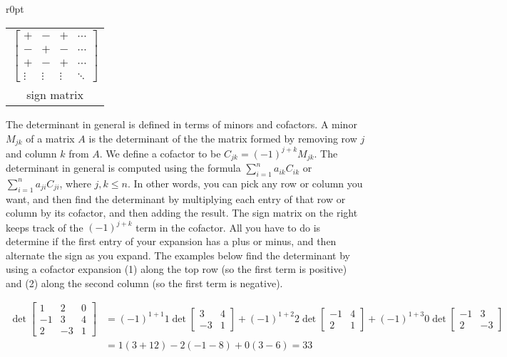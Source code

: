\documentclass[10pt]{article}
\begin{document}
\begin{wraptable}[7]{r}{0pt}
\small
\begin{tabular}{c}
$\begin{bmatrix}
+&-&+&\cdots\\
-&+&-&\cdots\\
+&-&+&\cdots\\
\vdots&\vdots&\vdots&\ddots
\end{bmatrix}$ 
\\
sign matrix
\end{tabular}\end{wraptable}
The determinant in general is defined in terms of minors and cofactors.  A minor {$M_{jk}$} of a matrix {$A$} is the determinant of the the matrix formed by removing row {$j$} and column {$k$} from {$A$}.  We define a cofactor to be {$C_{jk} = (-1)^{j+k}M_{jk}$}.  The determinant in general is computed using the formula {$\sum_{i=1}^n a_{ik}C_{ik}$} or {$\sum_{i=1}^n a_{ji}C_{ji}$}, where {$j,k\leq n$}. In other words, you can pick any row or column you want, and then find the determinant by multiplying each entry of that row or column by its cofactor, and then adding the result. The sign matrix on the right keeps track of the $(-1)^{j+k}$ term in the cofactor. All you have to do is determine if the first entry of your expansion has a plus or minus, and then alternate the sign as you expand. The examples below find the determinant by using a cofactor expansion (1) along the top row (so the first term is positive) and (2) along the second column (so the first term is negative).

$\begin{array}{rl} 
\det\begin{bmatrix}
1&2&0\\
-1&3&4\\
2&-3&1
\end{bmatrix} 
&=(-1)^{1+1}1\det\begin{bmatrix}
3&4\\
-3&1
\end{bmatrix}
+(-1)^{1+2} 2\det\begin{bmatrix}
-1&4\\
2&1
\end{bmatrix}
+(-1)^{1+3}0\det\begin{bmatrix}
-1&3\\
2&-3
\end{bmatrix} \\
&=1(3+12) -2(-1-8)+0(3-6) = 33\end{array}$
\end{document}
